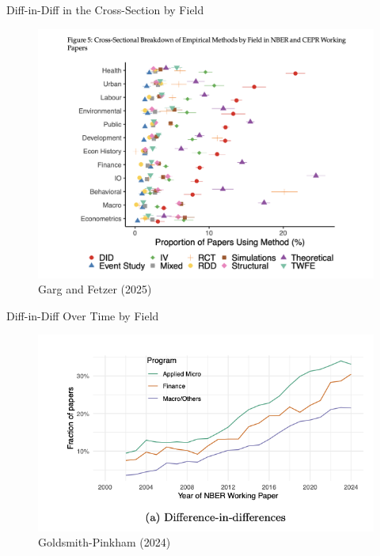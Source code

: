 \documentclass{beamer}
\begin{document}
\begin{frame}{Diff-in-Diff in the Cross-Section by Field}

	\begin{figure}
	\caption{Garg and Fetzer (2025)}
	\includegraphics[scale=0.25]{./lecture_includes/did_growth2}
	\end{figure}

\end{frame}



\begin{frame}{Diff-in-Diff Over Time by Field}

	\begin{figure}
	\caption{Goldsmith-Pinkham (2024)}
	\includegraphics[scale=0.75]{./lecture_includes/paul_did}
	\end{figure}

\end{frame}
\end{document}
